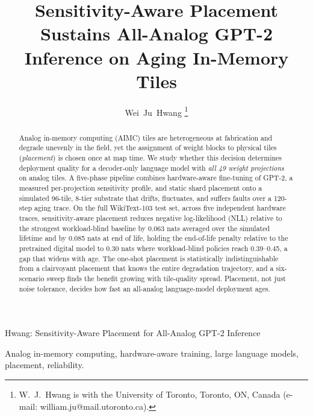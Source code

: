\documentclass[journal]{IEEEtran}
\begin{document}
\title{Sensitivity-Aware Placement Sustains All-Analog GPT-2 Inference
on Aging In-Memory Tiles}

\author{Wei~Ju~Hwang%
\thanks{W.~J.~Hwang is with the University of Toronto, Toronto, ON,
Canada (e-mail: william.ju@mail.utoronto.ca).}}

%
{Hwang: Sensitivity-Aware Placement for All-Analog GPT-2 Inference}

\maketitle

\begin{abstract}
Analog in-memory computing (AIMC) tiles are heterogeneous at fabrication
and degrade unevenly in the field, yet the assignment of weight blocks to
physical tiles (\emph{placement}) is chosen once at map time. We study whether
this decision determines deployment quality for a decoder-only
language model with \emph{all 49 weight projections} on analog tiles.
A five-phase
pipeline combines hardware-aware fine-tuning of GPT-2, a measured
per-projection sensitivity profile, and static shard placement onto a
simulated 96-tile, 8-tier substrate that drifts, fluctuates, and suffers
faults over a 120-step aging trace. On the full WikiText-103
test set, across five independent hardware traces, sensitivity-aware
placement reduces negative log-likelihood (NLL) relative to the strongest
workload-blind baseline by
0.063 nats averaged over the simulated lifetime and by 0.085 nats
at end of life,
holding the end-of-life penalty relative to the pretrained digital model
to 0.30 nats where workload-blind policies reach 0.39--0.45, a gap
that widens with age. The one-shot placement is statistically indistinguishable
from a clairvoyant placement that knows the entire degradation
trajectory, and a six-scenario sweep finds the benefit growing with
tile-quality spread. Placement, not just noise tolerance, decides how
fast an all-analog language-model deployment ages.
\end{abstract}

\begin{IEEEkeywords}
Analog in-memory computing, hardware-aware training, large language
models, placement, reliability.
\end{IEEEkeywords}

\end{document}
